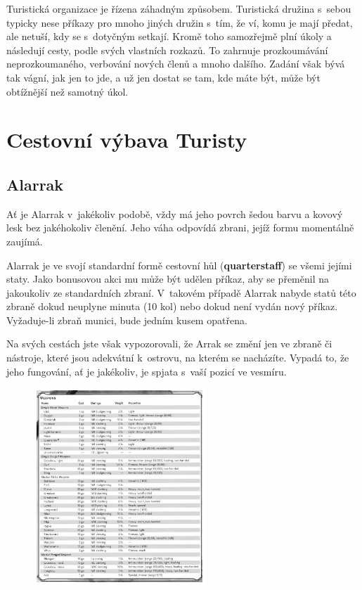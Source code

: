 \documentclass[a4paper,twocolumn,openany,nodeprecatedcode, justified]{dndbook}
\begin{document}
	Turistická organizace je řízena záhadným způsobem. Turistická družina s~sebou typicky nese příkazy pro mnoho jiných družin s~tím, že ví, komu je mají předat, ale netuší, kdy se s~dotyčným setkají. Kromě toho samozřejmě plní úkoly a následují cesty, podle svých vlastních rozkazů. To zahrnuje prozkoumávání neprozkoumaného, verbování nových členů a mnoho dalšího. Zadání však bývá tak vágní, jak jen to jde, a už jen dostat se tam, kde máte být, může být obtížnější než samotný úkol.
	
	\section{Cestovní výbava Turisty}
	
	\subsection{Alarrak}
	
	\begin{DndReadAloud}
		\sffamily
		Ať je Alarrak v~jakékoliv podobě, vždy má jeho povrch šedou barvu a kovový lesk bez jakéhokoliv členění. Jeho váha odpovídá zbrani, jejíž formu momentálně zaujímá.
	\end{DndReadAloud}
	
	Alarrak je ve svojí standardní formě cestovní hůl (\textbf{quarterstaff}) se všemi jejími staty. Jako bonusovou akci mu může být udělen příkaz, aby se přeměnil na jakoukoliv ze standardních zbraní. V~takovém případě Alarrak nabyde statů této zbraně dokud neuplyne minuta (10 kol) nebo dokud není vydán nový příkaz. Vyžaduje-li zbraň munici, bude jedním kusem opatřena.
	
	Na svých cestách jste však vypozorovali, že Arrak se změní jen ve zbraně či nástroje, které jsou adekvátní k~ostrovu, na kterém se nacházíte. Vypadá to, že jeho fungování, ať je jakékoliv, je spjata s~vaší pozicí ve vesmíru.
	
	\begin{figure}[h]
		\hspace*{-1cm}
		\includegraphics[width=0.57\textwidth]{Alarrak.png}
		\centering
	\end{figure}
	
\end{document}
